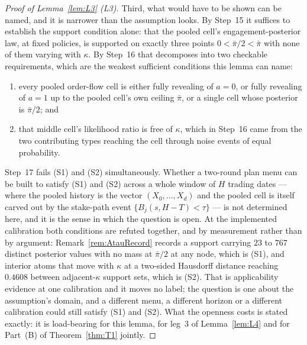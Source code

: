 \begin{proof}[Proof of Lemma~\ref{lem:L3} (L3)]
Third, what would have to be shown can be named, and it is narrower than the assumption looks. By
Step~15 it suffices to establish the support condition alone: that the pooled cell's
engagement-posterior law, at fixed policies, is supported on exactly three points
$0 < \bar\pi/2 < \bar\pi$ with none of them varying with $\kappa$. By Step~16 that decomposes into
two checkable requirements, which are the weakest sufficient conditions this lemma can name:
\begin{enumerate}[label=(S\arabic*),leftmargin=3.2em,itemsep=3pt]
\item every pooled order-flow cell is either fully revealing of $a=0$, or fully revealing of $a=1$ up
  to the pooled cell's own ceiling $\bar\pi$, or a single cell whose posterior is $\bar\pi/2$; and
\item that middle cell's likelihood ratio is free of $\kappa$, which in Step~16 came from the two
  contributing types reaching the cell through noise events of equal probability.
\end{enumerate}
Step~17 fails (S1) and (S2) simultaneously. Whether a two-round plan menu can be built to satisfy
(S1) and (S2) across a whole window of $H$ trading dates --- where the pooled history is the vector
$(X_0,\dots,X_d)$ and the pooled cell is itself carved out by the stake-path event
$\{B_j(s,H-T)<\tau\}$ --- is not determined here, and it is the sense in which the question is open.
At the implemented calibration both conditions are refuted together, and by measurement rather than
by argument: Remark~\ref{rem:AtauRecord} records a support carrying $23$ to $767$ distinct posterior
values with no mass at $\bar\pi/2$ at any node, which is (S1), and interior atoms that move with
$\kappa$ at a two-sided Hausdorff distance reaching $0.4608$ between adjacent-$\kappa$ support sets,
which is (S2). That is applicability evidence at one calibration and it moves no label; the question
is one about the assumption's domain, and a different menu, a different horizon or a different
calibration could still satisfy (S1) and (S2). What the openness costs is stated exactly: it is
load-bearing for this lemma, for leg~3 of Lemma~\ref{lem:L4} and for Part~(B) of
Theorem~\ref{thm:T1} jointly.
\end{proof}

